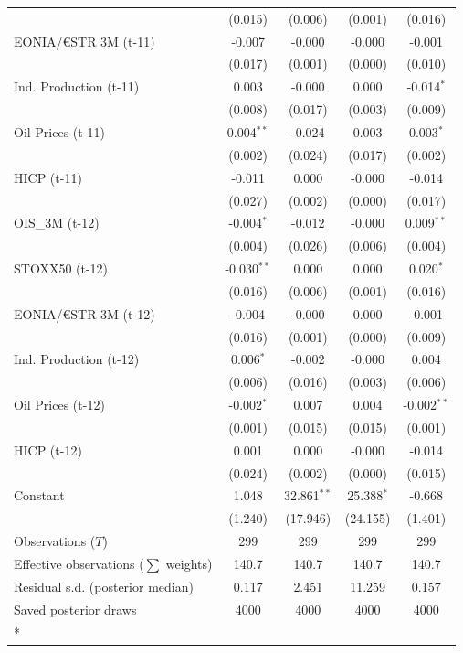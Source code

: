 \begin{longtable}[t]{lcccc}
 & (0.015) & (0.006) & (0.001) & (0.016)\\
EONIA/€STR 3M (t-11) & -0.007 & -0.000 & -0.000 & -0.001\\
 & (0.017) & (0.001) & (0.000) & (0.010)\\
Ind. Production (t-11) & 0.003 & -0.000 & 0.000 & -0.014$^{*}$\\
 & (0.008) & (0.017) & (0.003) & (0.009)\\
Oil Prices (t-11) & 0.004$^{**}$ & -0.024 & 0.003 & 0.003$^{*}$\\
 & (0.002) & (0.024) & (0.017) & (0.002)\\
HICP (t-11) & -0.011 & 0.000 & -0.000 & -0.014\\
 & (0.027) & (0.002) & (0.000) & (0.017)\\
OIS\_3M (t-12) & -0.004$^{*}$ & -0.012 & -0.000 & 0.009$^{**}$\\
 & (0.004) & (0.026) & (0.006) & (0.004)\\
STOXX50 (t-12) & -0.030$^{**}$ & 0.000 & 0.000 & 0.020$^{*}$\\
 & (0.016) & (0.006) & (0.001) & (0.016)\\
EONIA/€STR 3M (t-12) & -0.004 & -0.000 & 0.000 & -0.001\\
 & (0.016) & (0.001) & (0.000) & (0.009)\\
Ind. Production (t-12) & 0.006$^{*}$ & -0.002 & -0.000 & 0.004\\
 & (0.006) & (0.016) & (0.003) & (0.006)\\
Oil Prices (t-12) & -0.002$^{*}$ & 0.007 & 0.004 & -0.002$^{**}$\\
 & (0.001) & (0.015) & (0.015) & (0.001)\\
HICP (t-12) & 0.001 & 0.000 & -0.000 & -0.014\\
 & (0.024) & (0.002) & (0.000) & (0.015)\\
Constant & 1.048 & 32.861$^{**}$ & 25.388$^{*}$ & -0.668\\
 & (1.240) & (17.946) & (24.155) & (1.401)\\
\midrule
Observations ($T$) & 299 & 299 & 299 & 299\\
Effective observations ($\sum$ weights) & 140.7 & 140.7 & 140.7 & 140.7\\
Residual s.d. (posterior median) & 0.117 & 2.451 & 11.259 & 0.157\\
Saved posterior draws & 4000 & 4000 & 4000 & 4000\\*
\end{longtable}
\endgroup{}

